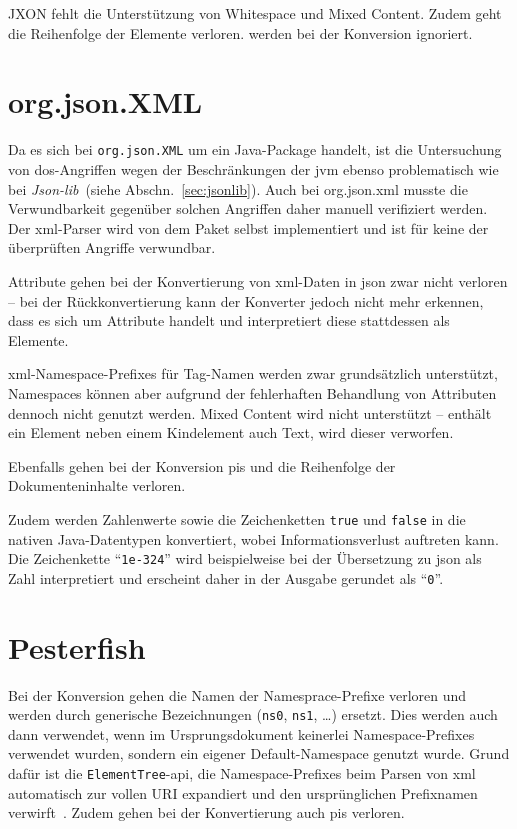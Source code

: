 JXON fehlt die Unterstützung von Whitespace und Mixed Content. Zudem geht die Reihenfolge der Elemente verloren.  werden bei der Konversion ignoriert.

\section{org.json.XML}
\label{sec:orgjsonxml}

Da es sich bei \texttt{org.json.XML} um ein Java-Package handelt, ist die Untersuchung von \acrshort{dos}-Angriffen wegen der Beschränkungen der \acrlong{jvm} ebenso problematisch wie bei \emph{Json-lib}~(siehe Abschn.~\ref{sec:jsonlib}). Auch bei org.json.\acrshort{xml} musste die Verwundbarkeit gegenüber solchen Angriffen daher manuell verifiziert werden. Der \acrshort{xml}-Parser wird von dem Paket selbst implementiert und ist für keine der überprüften Angriffe verwundbar.

Attribute gehen bei der Konvertierung von \acrshort{xml}-Daten in \acrshort{json} zwar nicht verloren -- bei der Rückkonvertierung kann der Konverter jedoch nicht mehr erkennen, dass es sich um Attribute handelt und interpretiert diese stattdessen als Elemente.

\acrshort{xml}-Namespace-Prefixes für Tag-Namen werden zwar grundsätzlich unterstützt, Namespaces können aber aufgrund der fehlerhaften Behandlung von Attributen dennoch nicht genutzt werden.
 Mixed Content wird nicht unterstützt -- enthält ein Element neben einem Kindelement auch Text, wird dieser verworfen.

Ebenfalls gehen bei der Konversion \glspl{pi} und die Reihenfolge der Dokumenteninhalte verloren.

Zudem werden Zahlenwerte sowie die Zeichenketten \texttt{true} und \texttt{false} in die nativen Java-Datentypen konvertiert, wobei Informationsverlust auftreten kann. Die Zeichenkette \enquote{\texttt{1e-324}} wird beispielweise bei der Übersetzung zu \acrshort{json} als Zahl interpretiert und erscheint daher in der Ausgabe gerundet als \enquote{\texttt{0}}.

\section{Pesterfish}
\label{sec:pesterfish}

Bei der Konversion gehen die Namen der Namesprace-Prefixe verloren und werden durch generische Bezeichnungen (\texttt{ns0}, \texttt{ns1}, \dots{}) ersetzt. Dies werden auch dann verwendet, wenn im Ursprungsdokument keinerlei Namespace-Prefixes verwendet wurden, sondern ein eigener Default-Namespace genutzt wurde. Grund dafür ist die \texttt{Element}\-\texttt{Tree}-\acrshort{api}, die Namespace-Prefixes beim Parsen von \acrshort{xml} automatisch zur vollen URI expandiert und den ursprünglichen Prefixnamen verwirft~\cite[Abschn.~20.5.1.7]{pythonetreexmlns}.
Zudem gehen bei der Konvertierung auch \glspl{pi} verloren.

